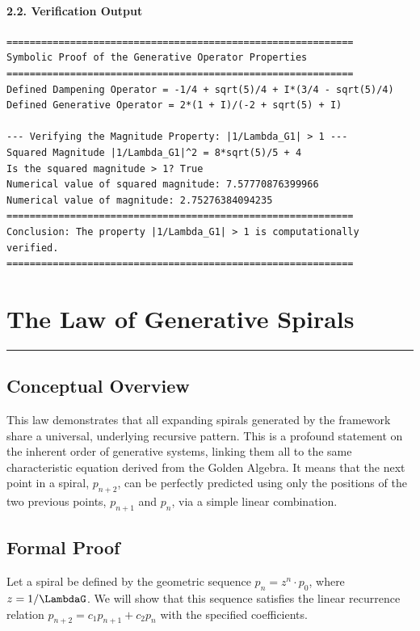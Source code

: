 \paragraph{2.2. Verification Output}
\begin{verbatim}
============================================================
Symbolic Proof of the Generative Operator Properties
============================================================
Defined Dampening Operator = -1/4 + sqrt(5)/4 + I*(3/4 - sqrt(5)/4)
Defined Generative Operator = 2*(1 + I)/(-2 + sqrt(5) + I)

--- Verifying the Magnitude Property: |1/Lambda_G1| > 1 ---
Squared Magnitude |1/Lambda_G1|^2 = 8*sqrt(5)/5 + 4
Is the squared magnitude > 1? True
Numerical value of squared magnitude: 7.57770876399966
Numerical value of magnitude: 2.75276384094235
============================================================
Conclusion: The property |1/Lambda_G1| > 1 is computationally verified.
============================================================
\end{verbatim}
\newpage


\section{The Law of Generative Spirals}
\label{sec:law_of_generative_spirals}
\hrule
\vspace{1em}


\subsection{Conceptual Overview}
This law demonstrates that all expanding spirals generated by the framework share a universal, underlying recursive pattern. This is a profound statement on the inherent order of generative systems, linking them all to the same characteristic equation derived from the Golden Algebra. It means that the next point in a spiral, $p_{n+2}$, can be perfectly predicted using only the positions of the two previous points, $p_{n+1}$ and $p_n$, via a simple linear combination.

\subsection{Formal Proof}
Let a spiral be defined by the geometric sequence $p_n = z^n \cdot p_0$, where $z = 1/\LambdaG$. We will show that this sequence satisfies the linear recurrence relation $p_{n+2} = c_1 p_{n+1} + c_2 p_n$ with the specified coefficients.

